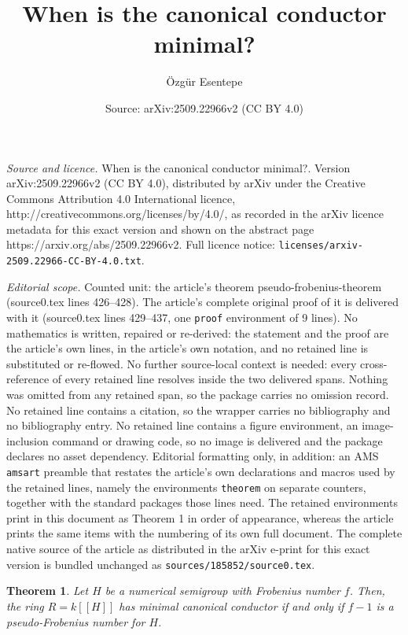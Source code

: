 \documentclass[10pt,a4paper]{amsart}
\title{When is the canonical conductor minimal?}
\author{\"Ozg\"ur Esentepe}
\date{Source: arXiv:2509.22966v2 (CC BY 4.0)}
\newtheorem{theorem}{Theorem}
\begin{document}
\maketitle

\noindent\emph{Source and licence.} When is the canonical conductor minimal?. Version arXiv:2509.22966v2 (CC BY 4.0), distributed by arXiv under the Creative Commons Attribution 4.0 International licence, http://creativecommons.org/licenses/by/4.0/, as recorded in the arXiv licence metadata for this exact version and shown on the abstract page https://arxiv.org/abs/2509.22966v2. Full licence notice: \texttt{licenses/arxiv-2509.22966-CC-BY-4.0.txt}.\par\smallskip

\noindent\textit{Editorial scope.} Counted unit: the article's theorem pseudo-frobenius-theorem (source0.tex lines 426--428). The article's complete original proof of it is delivered with it (source0.tex lines 429--437, one \texttt{proof} environment of 9 lines). No mathematics is written, repaired or re-derived: the statement and the proof are the article's own lines, in the article's own notation, and no retained line is substituted or re-flowed.  No further source-local context is needed: every cross-reference of every retained line resolves inside the two delivered spans.  Nothing was omitted from any retained span, so the package carries no omission record.  No retained line contains a citation, so the wrapper carries no bibliography and no bibliography entry.  No retained line contains a figure environment, an image-inclusion command or drawing code, so no image is delivered and the package declares no asset dependency.  Editorial formatting only, in addition: an AMS \texttt{amsart} preamble that restates the article's own declarations and macros used by the retained lines, namely the environments \texttt{theorem} on separate counters, together with the standard packages those lines need.  The retained environments print in this document as Theorem 1 in order of appearance, whereas the article prints the same items with the numbering of its own full document.  The complete native source of the article as distributed in the arXiv e-print for this exact version is bundled unchanged as \texttt{sources/185852/source0.tex}.
\begin{theorem}\label{pseudo-frobenius-theorem}
    Let $H$ be a numerical semigroup with Frobenius number $f$. Then, the ring $R = k[[H]]$ has minimal canonical conductor if and only if $f-1$ is a pseudo-Frobenius number for $H$. 
\end{theorem}
\end{document}
